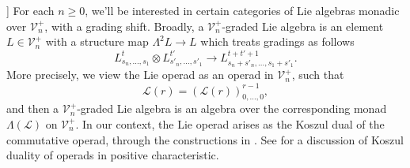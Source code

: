 \documentclass[11pt]{amsart}
\theoremstyle{plain}
\theoremstyle{definition}
\DeclareMathOperator{\im}{im}
\renewcommand{\to}{\longrightarrow}
\newcommand{\scrL}{\mathscr{L}}
\newcommand{\calV}{\mathcal{V}}
\theoremstyle{plain}
\newcommand{\LieOperad}{{\scrL}}
\newcommand{\vect}[2]{\calV^{#1}_{#2}}
\begin{document}
\begin{homotopy operations for PRLs}
]%
For each $n\geq0$, we'll be interested in certain categories of Lie algebras monadic over $\vect{+}{n}$, with a grading shift. Broadly, a $\vect{+}{n}$-graded Lie algebra is an element $L\in\vect{+}{n}$ with a structure map $\Lambda^2 L\to L$ which treats gradings as follows
\[L^{t}_{s_n,\ldots,s_1}\otimes L^{t'}_{s'_n,\ldots,s'_1}\to L^{t+t'+1}_{s_n+s'_n,\ldots,s_1+s'_1}.\]
More precisely, we view the Lie operad as an operad in $\vect{+}{n}$, such that
\[\LieOperad(r)=(\LieOperad(r))^{r-1}_{0,\ldots,0},\]
and then a $\vect{+}{n}$-graded Lie algebra is an algebra over the corresponding monad $\Lambda(\LieOperad)$ on $\vect{+}{n}$. In our context, the Lie operad arises as the Koszul dual of the commutative operad, through the constructions in \cite[\S5]{MR1089001}. See \cite[\S5.3.4]{FresseKoszulDuality.pdf} for a discussion of Koszul duality of operads in positive characteristic.


\end{homotopy operations for PRLs}
\end{document}
